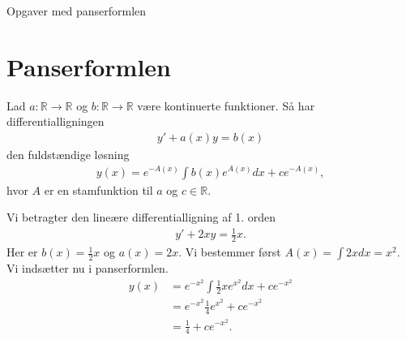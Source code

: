 
\begin{center}
\Huge
Opgaver med panserformlen
\end{center}
\section*{Panserformlen}

\begin{setn}[Panserformlen]
	Lad $a:\mathbb{R} \to \mathbb{R}$ og $b:\mathbb{R} \to \mathbb{R}$ være kontinuerte funktioner.
	Så har differentialligningen
	\begin{align*}
		y' + a(x) y =b(x)
	\end{align*}
	den fuldstændige løsning
	\begin{align*}
		y(x) = e^{-A(x)}\int b(x)e^{A(x)} dx + ce^{-A(x)},
	\end{align*}
	hvor $A$ er en stamfunktion til $a$ og $c\in \mathbb{R}$.
\end{setn}
\begin{exa}
	Vi betragter den lineære differentialligning af 1. orden
	\begin{align*}
		y' + 2xy = \frac{1}{2}x.
	\end{align*}
	Her er $b(x) = \frac{1}{2}x$ og $a(x) = 2x.$
	Vi bestemmer først $A(x) = \int 2x dx = x^2$. 
	Vi indsætter nu i panserformlen.
	\begin{align*}
		y(x) &= e^{-x^2}\int\frac{1}{2}xe^{x^2} dx  + ce^{-x^2}\\
		&=	e^{-x^2}\frac{1}{4}e^{x^2} + ce^{-x^2}\\
		&= \frac{1}{4}+ce^{-x^2}.
	\end{align*}
\end{exa}


